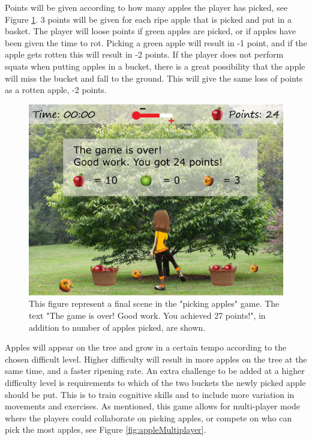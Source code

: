 Points will be given according to how many apples the player has picked, see Figure \ref{fig:appleOver}. 3 points will be given for each ripe apple that is picked and put in a basket. The player will loose points if green apples are picked, or if apples have been given the time to rot. Picking a green apple will result in -1 point, and if the apple gets rotten this will result in -2 points. If the player does not perform squats when putting apples in a bucket, there is a great possibility that the apple will miss the bucket and fall to the ground. This will give the same loss of points as a rotten apple, -2 points.       

\begin{figure} [H]
\centering
\includegraphics[scale=0.1]{appletreeendEng.jpg}
\caption[Picking apples - points]{This figure represent a final scene in the "picking apples" game. The text "The game is over! Good work. You achieved 27 points!", in addition to number of apples picked, are shown.}
\label{fig:appleOver}
\end{figure}

Apples will appear on the tree and grow in a certain tempo according to the chosen difficult level. Higher difficulty will result in more apples on the tree at the same time, and a faster ripening rate. An extra challenge to be added at a higher difficulty level is requirements to which of the two buckets the newly picked apple should be put. This is to train cognitive skills and to include more variation in movements and exercises. As mentioned, this game allows for multi-player mode where the players could collaborate on picking apples, or compete on who can pick the most apples, see Figure \ref{fig:appleMultiplayer}. 


